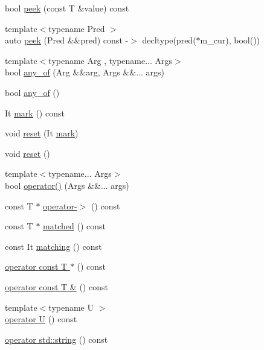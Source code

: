 \begin{DoxyCompactItemize}
\item 
bool \hyperlink{class_matcher_a28b154cbc4cb7ae203810043e069ae38}{peek} (const T \&value) const
\item 
{\footnotesize template$<$typename Pred $>$ }\\auto \hyperlink{class_matcher_a4c92e3958c64eee29812f4ed75c331cf}{peek} (Pred \&\&pred) const -\/$>$ decltype(pred($\ast$m\+\_\+cur), bool())
\item 
{\footnotesize template$<$typename Arg , typename... Args$>$ }\\bool \hyperlink{class_matcher_a1db8b27d158ba0010bf7c69559773112}{any\+\_\+of} (Arg \&\&arg, Args \&\&... args)
\item 
bool \hyperlink{class_matcher_a6cfab4944429c85a33d872691e0976c8}{any\+\_\+of} ()
\item 
It \hyperlink{class_matcher_af9135752ac195a21c230267d52db6623}{mark} () const
\item 
void \hyperlink{class_matcher_abb67aa2acac25b34d80ffb2e64eef44c}{reset} (It \hyperlink{class_matcher_af9135752ac195a21c230267d52db6623}{mark})
\item 
void \hyperlink{class_matcher_a18de8d97996c28deb6ac787f2a0981a6}{reset} ()
\item 
{\footnotesize template$<$typename... Args$>$ }\\bool \hyperlink{class_matcher_a2c1cbd69f6fcbbcf40e9e66333cfddca}{operator()} (Args \&\&... args)
\item 
const T $\ast$ \hyperlink{class_matcher_a3613bf19482915302d6647e25d9facb2}{operator-\/$>$} () const
\item 
const T $\ast$ \hyperlink{class_matcher_a6a43511495d338b4572dcb52e96fc3a3}{matched} () const
\item 
const It \hyperlink{class_matcher_abf9d0a1f24372dc9dde031ae6df26921}{matching} () const
\item 
\hyperlink{class_matcher_ae3f74b07e355126855e40db722c7a51d}{operator const T $\ast$} () const
\item 
\hyperlink{class_matcher_a7b808eac9d5d10c2d417869bf630d6ec}{operator const T \&} () const
\item 
{\footnotesize template$<$typename U $>$ }\\\hyperlink{class_matcher_a0bd21eb19304624235c6cb208fa1216a}{operator U} () const
\item 
\hyperlink{class_matcher_adc54a96fcfc40186d82a91baeb09211c}{operator std\+::string} () const
\end{DoxyCompactItemize}


